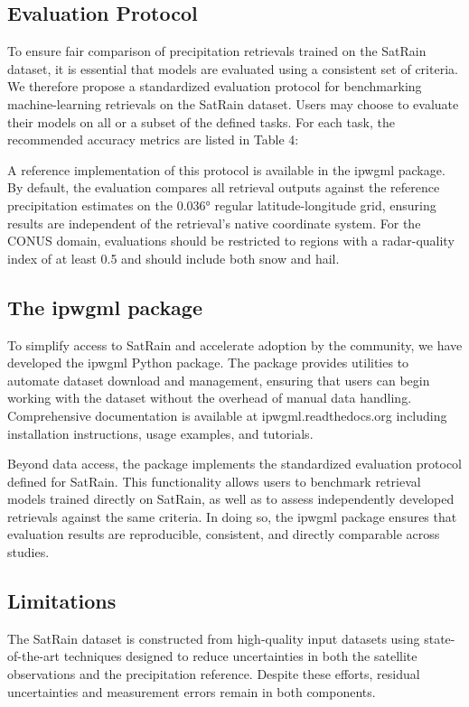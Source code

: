 \documentclass[11pt]{article}
\begin{document}
\subsection{Evaluation Protocol}

To ensure fair comparison of precipitation retrievals trained on the SatRain
dataset, it is essential that models are evaluated using a consistent set of
criteria. We therefore propose a standardized evaluation protocol for
benchmarking machine-learning retrievals on the SatRain dataset. Users may
choose to evaluate their models on all or a subset of the defined tasks. For
each task, the recommended accuracy metrics are listed in Table 4:

A reference implementation of this protocol is available in the ipwgml package.
By default, the evaluation compares all retrieval outputs against the reference
precipitation estimates on the 0.036° regular latitude-longitude grid, ensuring
results are independent of the retrieval’s native coordinate system. For the
CONUS domain, evaluations should be restricted to regions with a radar-quality
index of at least 0.5 and should include both snow and hail.


\subsection{The ipwgml package}

To simplify access to SatRain and accelerate adoption by the community, we have
developed the ipwgml Python package. The package provides utilities to automate
dataset download and management, ensuring that users can begin working with the
dataset without the overhead of manual data handling. Comprehensive
documentation is available at ipwgml.readthedocs.org including installation
instructions, usage examples, and tutorials.

Beyond data access, the package implements the standardized evaluation protocol
defined for SatRain. This functionality allows users to benchmark retrieval
models trained directly on SatRain, as well as to assess independently developed
retrievals against the same criteria. In doing so, the ipwgml package ensures
that evaluation results are reproducible, consistent, and directly comparable
across studies.

\subsection{Limitations}

The SatRain dataset is constructed from high-quality input datasets using
state-of-the-art techniques designed to reduce uncertainties in both the
satellite observations and the precipitation reference. Despite these efforts,
residual uncertainties and measurement errors remain in both components.
\end{document}
